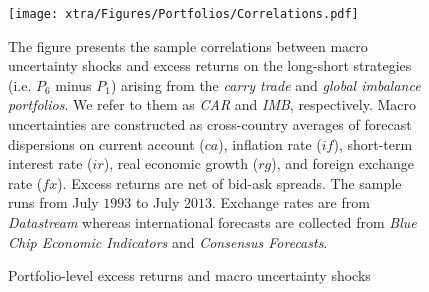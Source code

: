 \begin{landscape}
	\begin{figure}
		\begin{center}
			\texttt{[image: xtra/Figures/Portfolios/Correlations.pdf]}
		\end{center}
		\vspace{4cm}
		
		\caption{Portfolio-level excess returns and macro uncertainty shocks} \label{fig:portfolios_correlations} \smallskip
		\begin{footnotesize}
			The figure presents the sample correlations between macro uncertainty shocks and excess returns on the long-short strategies (i.e. $P_6$ minus $P_1$) arising from the \emph{carry trade} and \emph{global imbalance portfolios}. We refer to them as \emph{CAR} and \emph{IMB}, respectively. Macro uncertainties are constructed as cross-country averages of forecast dispersions on current account ($ca$), inflation rate ($if$), short-term interest rate ($ir$), real economic growth ($rg$), and foreign exchange rate ($fx$). Excess returns are net of bid-ask spreads. The sample runs from July $1993$ to July $2013$. Exchange rates are from \textit{Datastream} whereas international forecasts are collected from \textit{Blue Chip Economic Indicators} and \textit{Consensus Forecasts}.
		\end{footnotesize}
		
	\end{figure}
\end{landscape}

